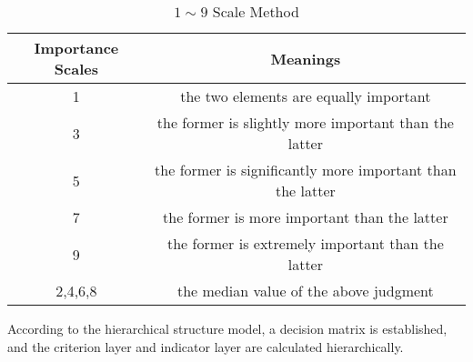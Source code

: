 \documentclass[12pt]{article}
\begin{document}
	\begin{table}[!htbp]
		\begin{center}
			\caption{$1\sim9$ Scale Method}
			\label{tb:biao}
			\begin{tabular}{cc}
				\toprule
				\multicolumn{1}{m{5cm}}{\centering \textbf{Importance Scales}}
				& \multicolumn{1}{m{10cm}}{\centering \textbf{Meanings}}\\
				\midrule
				1 & the two elements are equally important \\
				3 & the former is slightly more important than the latter\\
				5 & the former is significantly more important than the latter\\
				7 & the former is more important than the latter\\
				9 & the former is extremely important than the latter\\
				2,4,6,8 & the median value of the above judgment\\
				\bottomrule
			\end{tabular}
		\end{center}
	\end{table}

	According to the hierarchical structure model, a decision matrix is established, and the criterion layer and indicator layer are calculated hierarchically.
	
\end{document}

